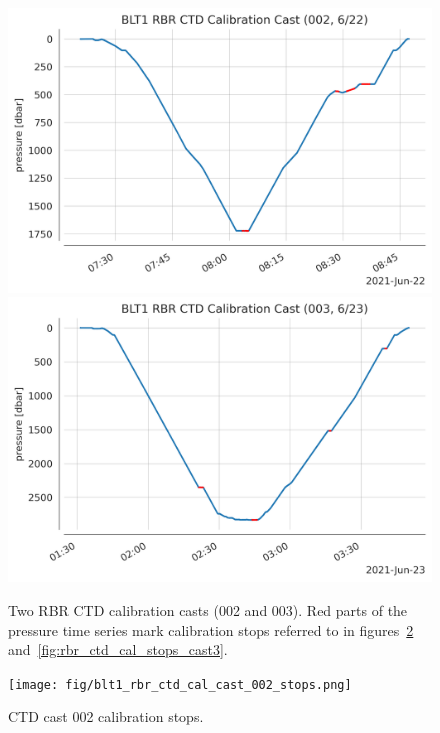 \documentclass[10pt,letterpaper]{article}
\begin{document}
\begin{figure}[htpb]
    \centering
    \includegraphics[width=0.7\linewidth]{fig/blt1_rbr_ctd_cal_cast_20210622.png}
    \includegraphics[width=0.7\linewidth]{fig/blt1_rbr_ctd_cal_cast_20210623.png}
    \caption{Two RBR CTD calibration casts (002 and 003). Red parts of the pressure time series mark calibration stops referred to in figures~\ref{fig:rbr_ctd_cal_stops_cast2} and~\ref{fig:rbr_ctd_cal_stops_cast3}.}%
    \label{fig:fig/rbr_ctd_cal_casts_overview}
\end{figure}

\begin{figure}[htpb]
    \centering
    \texttt{[image: fig/blt1\_rbr\_ctd\_cal\_cast\_002\_stops.png]}
    \caption{CTD cast 002 calibration stops.}%
    \label{fig:rbr_ctd_cal_stops_cast2}
\end{figure}
\end{document}

